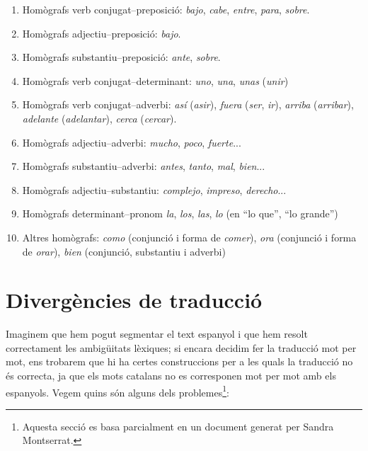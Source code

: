 \begin{enumerate}
\item Homògrafs verb conjugat--preposició: \emph{bajo}, {\em
    cabe}, \emph{entre}, \emph{para}, \emph{sobre}.

\item Homògrafs adjectiu--preposició: \emph{bajo}.

\item Homògrafs substantiu--preposició: \emph{ante}, \emph{sobre}.

\item Homògrafs verb conjugat--determinant:  \emph{uno}, \emph{una},
  \emph{unas} (\emph{unir})
    
\item Homògrafs verb conjugat--adverbi: \emph{así} (\emph{asir}),
    \emph{fuera} (\emph{ser}, \emph{ir}), \emph{ arriba} (\emph{arribar}), {\em
      adelante} (\emph{adelantar}), \emph{cerca} (\emph{cercar}).

\item Homògrafs adjectiu--adverbi: \emph{mucho}, \emph{poco}, {\em
    fuerte}...

\item Homògrafs substantiu--adverbi: \emph{antes}, \emph{tanto},
  \emph{mal}, \emph{bien}...

\item Homògrafs adjectiu--substantiu: \emph{complejo}, {\em
    impreso}, \emph{derecho}...

\item Homògrafs determinant--pronom
    \emph{la}, \emph{los}, \emph{las}, \emph{lo} (en ``lo que'', ``lo grande'')

\item Altres homògrafs: \emph{como} (conjunció i forma de \emph{comer}), \emph{ora} 
  (conjunció i forma de \emph{orar}), \emph{bien} (conjunció, substantiu i
adverbi)

\end{enumerate}


\section{Divergències de traducció}

Imaginem que hem pogut segmentar el text espanyol i que hem resolt 
correctament les ambigüitats
lèxiques; si encara decidim fer la traducció mot per mot, ens
trobarem que hi ha certes construccions per a les quals la
traducció no és correcta, ja que els mots catalans no es
corresponen mot per mot amb els espanyols. Vegem quins són 
alguns dels problemes\footnote{Aquesta secció es basa parcialment 
en un  document generat per Sandra Montserrat.}:

